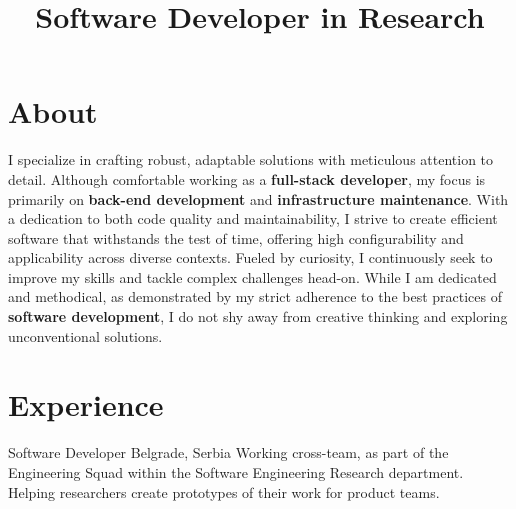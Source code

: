 \documentclass[12pt,a4paper,sans]{moderncv}
\title{Software Developer in Research}
\begin{document}
\makecvtitle

\section{About}

I specialize in crafting robust, adaptable solutions with meticulous attention
to detail. Although comfortable working as a \textbf{full-stack developer}, my
focus is primarily on \textbf{back-end development} and \textbf{infrastructure maintenance}.
With a dedication to both code quality and maintainability, I strive to create
efficient software that withstands the test of time, offering high configurability
and applicability across diverse contexts. Fueled by curiosity, I continuously
seek to improve my skills and tackle complex challenges head-on. While I am
dedicated and methodical, as demonstrated by my strict adherence to the best
practices of \textbf{software development}, I do not shy away from creative
thinking and exploring unconventional solutions.


\section{Experience}

{Software Developer}
{}
{Belgrade, Serbia}{}
{
    Working cross-team, as part of the Engineering Squad within the Software
    Engineering Research department. Helping researchers create prototypes of
    their work for product teams.
}
\end{document}
